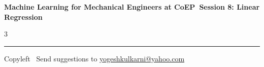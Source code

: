 \documentclass[8pt,landscape]{article}
\begin{document}
\footnotesize

\begin{center}
\Large{\textbf{Machine Learning for Mechanical Engineers at CoEP\ Session 8: Linear Regression}}
\end{center}

\begin{multicols}{3}

\end{multicols}

\rule{\linewidth}{0.25pt}
\scriptsize
Copyleft \textcopyleft\  Send suggestions to
\href{http://www.yogeshkulkarni.com}{yogeshkulkarni@yahoo.com}
\end{document}
